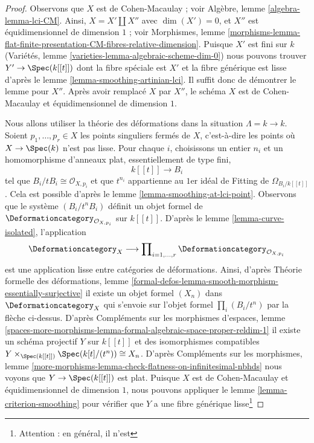 \begin{proof}
Observons que $X$ est de Cohen-Macaulay ; voir
Algèbre, lemme \ref{algebra-lemma-lci-CM}.
Ainsi, $X = X' \amalg X''$ avec $\dim(X') = 0$,
et $X''$ est équidimensionnel de dimension $1$ ; voir Morphismes, lemme
\ref{morphisms-lemma-flat-finite-presentation-CM-fibres-relative-dimension}.
Puisque $X'$ est fini sur $k$ (Variétés, lemme
\ref{varieties-lemma-algebraic-scheme-dim-0})
nous pouvons trouver $Y' \to \Spec(k[[t]])$ dont la fibre
spéciale est $X'$ et la fibre générique est lisse d'après le
lemme \ref{lemma-smoothing-artinian-lci}.
Il suffit donc de démontrer le lemme pour $X''$.
Après avoir remplacé $X$ par $X''$, le schéma $X$ est
de Cohen-Macaulay et équidimensionnel de dimension $1$.

\medskip\noindent
Nous allons utiliser la théorie des déformations dans la situation $\Lambda = k \to k$.
Soient $p_1, \ldots, p_r \in X$ les points singuliers fermés de $X$, c'est-à-dire
les points où $X \to \Spec(k)$ n'est pas lisse. Pour chaque $i$, choisissons
un entier $n_i$ et un homomorphisme d'anneaux plat, essentiellement de type fini,
$$
k[[t]] \longrightarrow B_i
$$
tel que $B_i/tB_i \cong \mathcal{O}_{X, p_i}$ et que
$t^{n_i}$ appartienne au $1$er idéal de Fitting de $\Omega_{B_i/k[[t]]}$.
Cela est possible d'après le lemme \ref{lemma-smoothing-at-lci-point}.
Observons que le système $(B_i/t^nB_i)$ définit un objet formel de
$\Deformationcategory_{\mathcal{O}_{X, p_i}}$ sur $k[[t]]$.
D'après le lemme \ref{lemma-curve-isolated}, l'application
$$
\Deformationcategory_X
\longrightarrow
\prod\nolimits_{i = 1, \ldots, r} \Deformationcategory_{\mathcal{O}_{X, p_i}}
$$
est une application lisse entre catégories de déformations. Ainsi, d'après
Théorie formelle des déformations, lemme
\ref{formal-defos-lemma-smooth-morphism-essentially-surjective}
il existe un objet formel $(X_n)$ dans $\Deformationcategory_X$
qui s'envoie sur l'objet formel $\prod_i (B_i/t^n)$ par la flèche ci-dessus.
D'après Compléments sur les morphismes d'espaces, lemme
\ref{spaces-more-morphisms-lemma-formal-algebraic-space-proper-reldim-1}
il existe un schéma projectif $Y$ sur $k[[t]]$ et des isomorphismes compatibles
$Y \times_{\Spec(k[[t]])} \Spec(k[t]/(t^n)) \cong X_n$.
D'après Compléments sur les morphismes, lemme
\ref{more-morphisms-lemma-check-flatness-on-infinitesimal-nbhds}
nous voyons que $Y \to \Spec(k[[t]])$ est plat.
Puisque $X$ est de Cohen-Macaulay et équidimensionnel de dimension $1$,
nous pouvons appliquer le lemme \ref{lemma-criterion-smoothing}
pour vérifier que $Y$ a une fibre générique lisse\footnote{Attention : en général, il n'est
}
\end{proof}
